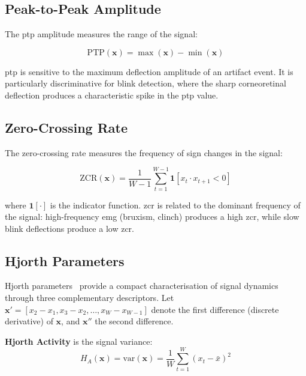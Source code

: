 \subsection{Peak-to-Peak Amplitude}

The \acrfull{ptp} amplitude measures the range of the signal:

\begin{equation}
\text{PTP}(\mathbf{x}) = \max(\mathbf{x}) - \min(\mathbf{x})
\label{eq:ptp}
\end{equation}

\acrshort{ptp} is sensitive to the maximum deflection
amplitude of an artifact event. It is particularly
discriminative for blink detection, where the sharp
corneoretinal deflection produces a characteristic spike
in the \acrshort{ptp} value.

\subsection{Zero-Crossing Rate}

The zero-crossing rate measures the frequency of sign changes
in the signal:

\begin{equation}
\text{ZCR}(\mathbf{x}) = \frac{1}{W-1}
\sum_{t=1}^{W-1} \mathbf{1}\left[x_t \cdot x_{t+1} < 0\right]
\label{eq:zcr}
\end{equation}

\noindent where $\mathbf{1}[\cdot]$ is the indicator function.
\acrshort{zcr} is related to the dominant frequency of the
signal: high-frequency \acrshort{emg} (bruxism, clinch) produces
a high \acrshort{zcr}, while slow blink deflections produce
a low \acrshort{zcr}.

\subsection{Hjorth Parameters}

Hjorth parameters~\cite{hjorth1970eeg} provide a compact
characterisation of signal dynamics through three
complementary descriptors. Let $\mathbf{x}' = [x_2 - x_1,
x_3 - x_2, \ldots, x_W - x_{W-1}]$ denote the first
difference (discrete derivative) of $\mathbf{x}$, and
$\mathbf{x}''$ the second difference.

\textbf{Hjorth Activity} is the signal variance:
\begin{equation}
H_A(\mathbf{x}) = \text{var}(\mathbf{x})
= \frac{1}{W}\sum_{t=1}^{W}(x_t - \bar{x})^2
\label{eq:hjorth_activity}
\end{equation}

